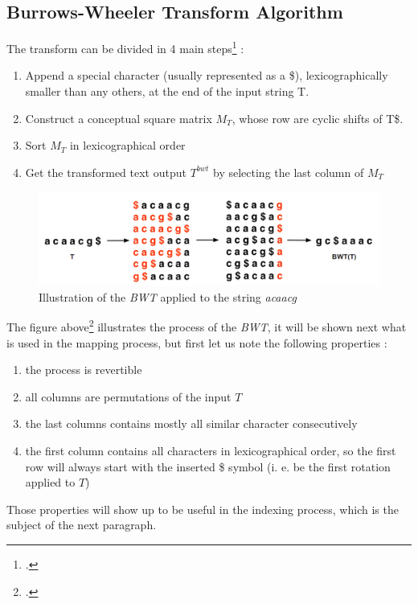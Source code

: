 \subsection{Burrows-Wheeler Transform Algorithm}

The transform can be divided in 4 main steps\footcite{BWT0} :
\begin{enumerate}
\item Append a special character (usually represented as a \$), lexicographically smaller than any others, at the end of the input string \textrm{T}.
\item Construct a conceptual square matrix $M_T$, whose row are cyclic shifts of \textrm{T\$}.
\item Sort $M_T$ in lexicographical order
\item Get the transformed text output $T^{bwt}$ by selecting the last column of $M_T$ 
\end{enumerate}

\begin{center}
\begin{figure}[h]
\hspace{10mm}	\includegraphics[scale=0.3]{Figures/BWT_MIT.png}
\caption{Illustration of the \textsl{BWT} applied to the string \textit{acaacg}}
\end{figure}
\end{center}
The figure above\footcite{MIT_BWT} illustrates the process of the \textsl{BWT}, it will be shown next what is used in the mapping process, but first let us note the following properties :
\begin{enumerate}
\item the process is revertible
\item all columns are permutations of the input $T$
\item the last columns contains mostly all similar character consecutively
\item the first column contains all characters in lexicographical order, so the first row will always start with the inserted \$ symbol (i. e. be the first rotation applied to $T$)
\end{enumerate}
Those properties will show up to be useful in the indexing process, which is the subject of the next paragraph.

